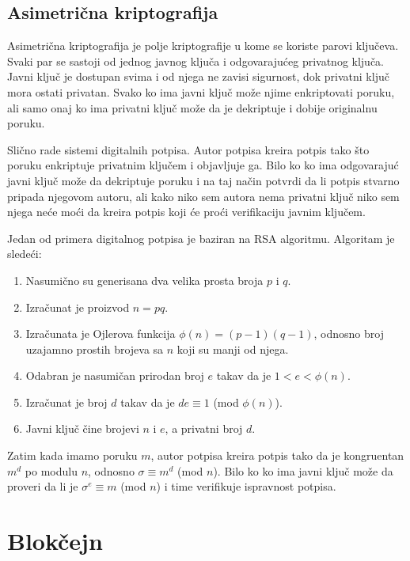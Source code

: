 \documentclass[a4paper]{article}
\begin{document}
\subsection{Asimetrična kriptografija}
Asimetrična kriptografija je polje kriptografije u kome se koriste parovi ključeva. Svaki par se sastoji od jednog javnog ključa i odgovarajućeg privatnog ključa. Javni ključ je dostupan svima i od njega ne zavisi sigurnost, dok privatni ključ mora ostati privatan. Svako ko ima javni ključ može njime enkriptovati poruku, ali samo onaj ko ima privatni ključ može da je dekriptuje i dobije originalnu poruku. 

Slično rade sistemi digitalnih potpisa. Autor potpisa kreira potpis tako što poruku enkriptuje privatnim ključem i objavljuje ga. Bilo ko ko ima odgovarajuć javni ključ može da dekriptuje poruku i na taj način potvrdi da li potpis stvarno pripada njegovom autoru, ali kako niko sem autora nema privatni ključ niko sem njega neće moći da kreira potpis koji će proći verifikaciju javnim ključem. 

Jedan od primera digitalnog potpisa je baziran na RSA algoritmu. Algoritam je sledeći:
\begin{enumerate}   
    \item Nasumično su generisana dva velika prosta broja $p$ i $q$.
    \item Izračunat je proizvod $n = pq$.
    \item Izračunata je Ojlerova funkcija $\phi(n)=(p - 1)(q - 1)$, odnosno broj uzajamno prostih brojeva sa $n$ koji su manji od njega.
    \item  Odabran je nasumičan prirodan broj $e$ takav da je $1 < e < \phi(n)$.
    \item Izračunat je broj $d$ takav da je $de \equiv 1$ (mod $\phi(n)$).
    \item Javni ključ čine brojevi $n$ i $e$, a privatni broj $d$.
\end{enumerate}

Zatim kada imamo poruku $m$, autor potpisa kreira potpis tako da je kongruentan $m^{d}$ po modulu $n$, odnosno $\sigma \equiv m^{d}$ (mod $n$). Bilo ko ko ima javni ključ može da proveri da li je  ${\sigma}^{e} \equiv m$ (mod $n$) i time verifikuje ispravnost potpisa.


\section{Blokčejn}
\label{sec:blockchain}
\end{document}
